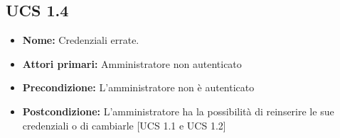 \subsection{UCS 1.4}%
\begin{itemize}
\item \textbf{Nome:} Credenziali errate.
\item \textbf{Attori primari:} Amministratore non autenticato
\item \textbf{Precondizione:}  L'amministratore non è autenticato
\item \textbf{Postcondizione:} L'amministratore ha la possibilità di reinserire le sue credenziali o di cambiarle [UCS 1.1 e UCS 1.2]
\end{itemize}

